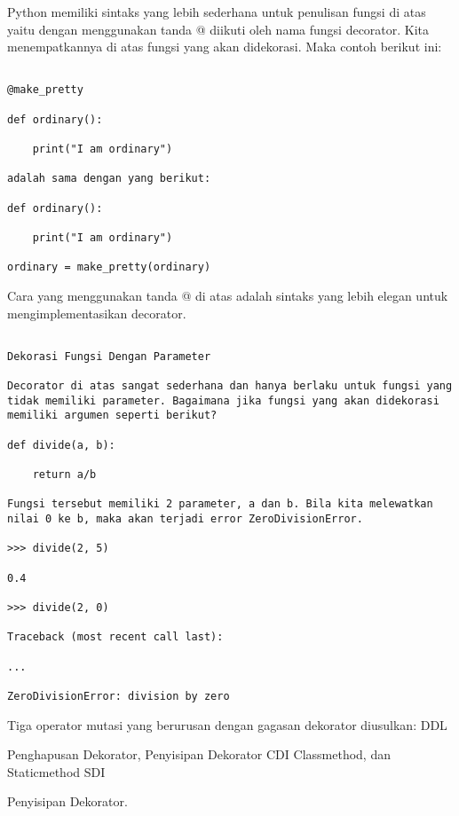 Python memiliki sintaks yang lebih sederhana untuk penulisan fungsi di atas yaitu dengan menggunakan tanda  @ diikuti oleh nama fungsi decorator. Kita menempatkannya di atas fungsi yang akan didekorasi. Maka contoh berikut ini:



\begin{verbatim}

@make_pretty

def ordinary():

    print("I am ordinary")

adalah sama dengan yang berikut:

def ordinary():

    print("I am ordinary")

ordinary = make_pretty(ordinary)

\end{verbatim}

Cara yang menggunakan tanda @ di atas adalah sintaks yang lebih elegan untuk mengimplementasikan decorator.



\begin{verbatim}

Dekorasi Fungsi Dengan Parameter

Decorator di atas sangat sederhana dan hanya berlaku untuk fungsi yang tidak memiliki parameter. Bagaimana jika fungsi yang akan didekorasi memiliki argumen seperti berikut?

def divide(a, b):

    return a/b

Fungsi tersebut memiliki 2 parameter, a dan b. Bila kita melewatkan nilai 0 ke b, maka akan terjadi error ZeroDivisionError.

>>> divide(2, 5)

0.4

>>> divide(2, 0)

Traceback (most recent call last):

...

ZeroDivisionError: division by zero

\end{verbatim}



Tiga operator mutasi yang berurusan dengan gagasan dekorator diusulkan: DDL

Penghapusan Dekorator, Penyisipan Dekorator CDI Classmethod, dan Staticmethod SDI

Penyisipan Dekorator.

